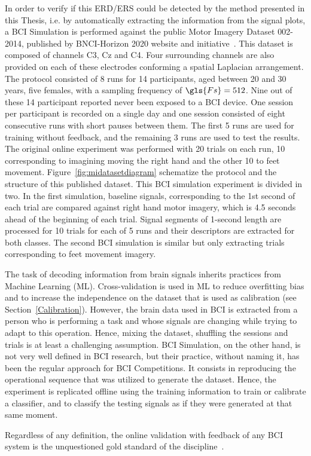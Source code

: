 In order to verify if this ERD/ERS could be detected by the method presented in this Thesis, i.e. by automatically extracting the information from the signal plots, a BCI Simulation is performed against the public Motor Imagery Dataset 002-2014, published by BNCI-Horizon 2020 website and initiative~\cite{Steyrl2015}.  This dataset is composed of channels C3, Cz and C4.  Four surrounding channels are also provided on each of these electrodes conforming a spatial Laplacian arrangement. The protocol consisted of 8 runs for 14 participants, aged between 20 and 30 years, five females, with a sampling frequency of $\gls{Fs} = 512$. Nine out of these 14 participant reported never been exposed to a BCI device.  One session per participant is recorded on a single day and one session consisted of eight consecutive runs with short pauses between them.  The first 5 runs are used for training without feedback, and the remaining 3 runs are used to test the results.  The original online experiment was performed with 20 trials on each run, 10 corresponding to imagining moving the right hand and the other 10 to feet movement.  Figure~\ref{fig:midatasetdiagram} schematize the protocol and the structure of this published dataset.  This BCI simulation experiment is divided in two.  In the first simulation, baseline signals, corresponding to the 1st second of each trial are compared against right hand motor imagery, which is 4.5 seconds ahead of the beginning of each trial. Signal segments of 1-second length are processed for 10 trials for each of 5 runs and their descriptors are extracted for both classes.  The second BCI simulation is similar but only extracting trials corresponding to feet movement imagery.



\begin{story}
The task of decoding information from brain signals inherits practices from Machine Learning (ML).  Cross-validation is used in ML to reduce overfitting bias and to increase the independence on the dataset that is used as calibration (see Section~\ref{Calibration}).  However, the brain data used in BCI is extracted from a person who is performing a task and whose signals are changing while trying to adapt to this operation.  Hence, mixing the dataset, shuffling the sessions and trials is at least a challenging assumption.  BCI Simulation, on the other hand, is not very well defined in BCI research, but their practice, without naming it, has been the regular approach for BCI Competitions. It consists in reproducing the operational sequence that was utilized to generate the dataset. Hence, the experiment is replicated offline using the training information to train or calibrate a classifier, and to classify the testing signals as if they were generated at that same moment.

Regardless of any definition, the online validation with feedback of any BCI system is the unquestioned gold standard of the discipline~\cite{WolpawJonathanR2012}.
\end{story}


